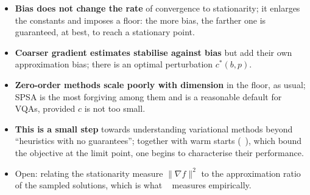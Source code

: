 \documentclass[handoutsbeamer.tex]{subfiles}
\begin{document}
\begin{frame}
\begin{itemize}\setlength\itemsep{0.4em}
    \item \textbf{Bias does not change the rate} of convergence to stationarity; it enlarges the constants and imposes a floor: the more bias, the farther one is guaranteed, at best, to reach a stationary point.
    \item \textbf{Coarser gradient estimates stabilise against bias} but add their own approximation bias; there is an optimal perturbation $c^*(b, p)$.
    \item \textbf{Zero-order methods scale poorly with dimension} in the floor, as usual; SPSA is the most forgiving among them and is a reasonable default for VQAs, provided $c$ is not too small.
    \item \textbf{This is a small step} towards understanding variational methods beyond ``heuristics with no guarantees''; together with warm starts (\Chap~), which bound the objective at the limit point, one begins to characterise their performance.
    \item Open: relating the stationarity measure $\|\nabla f\|^2$ to the approximation ratio of the sampled solutions, which is what \Chap~ measures empirically.
\end{itemize}
\end{frame}

\begin{frame}[allowframebreaks]
\biblio
\end{frame}
\end{document}
